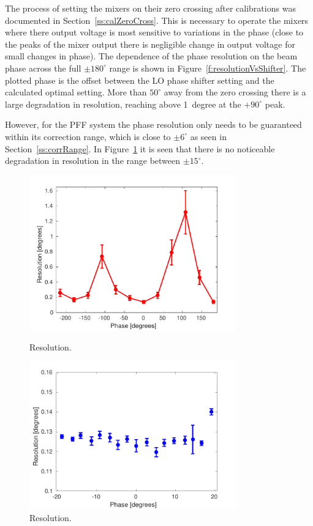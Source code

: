 The process of setting the mixers on their zero crossing after calibrations was documented in Section~\ref{ss:calZeroCross}. This is necessary to operate the mixers where there output voltage is most sensitive to variations in the phase (close to the peaks of the mixer output there is negligible change in output voltage for small changes in phase). The dependence of the phase resolution on the beam phase across the full \(\pm180^\circ\) range is shown in Figure~\ref{f:resolutionVsShifter}. The plotted phase is the offset between the LO phase shifter setting and the calculated optimal setting. More than \(50^\circ\) away from the zero crossing there is a large degradation in resolution, reaching above 1~degree at the \(+90^\circ\) peak.

However, for the PFF system the phase resolution only needs to be guaranteed within its correction range, which is close to \(\pm6^\circ\) as seen in Section~\ref{ss:corrRange}. In Figure~\ref{f:resVsSmallPhasOff} it is seen that there is no noticeable degradation in resolution in the range between \(\pm15^\circ\).

\begin{figure}
  \centering
  \includegraphics[width=0.8\textwidth]{Figures/phaseMons/resolutionVsShifter}
  \caption{Resolution.}
  \label{f:resolutionVsShifter}
  \includegraphics[width=0.8\textwidth]{Figures/phaseMons/resVsSmallPhasOff}
  \caption{Resolution.}
  \label{f:resVsSmallPhasOff}
\end{figure}


